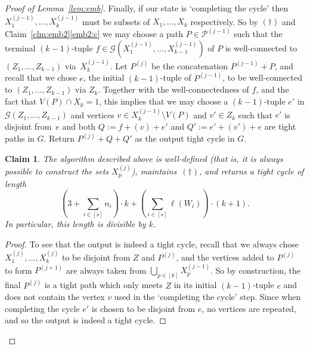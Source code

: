 \documentclass[12pt,a4paper]{amsart}
\newtheorem{claim}[theorem] {Claim}
\newcommand{\oldqed}{}
\def\endofClaim{\hfill\scalebox{.6}{$\Box$}}
\newenvironment{claimproof}[1][Proof]{
  \renewcommand{\oldqed}{\qedsymbol}
  \renewcommand{\qedsymbol}{\endofClaim}
  \begin{proof}[#1]
}{
  \end{proof}
  \renewcommand{\qedsymbol}{\oldqed}
}
\newcommand{\cG}{\mathcal{G}}
\newcommand{\paths}{\mathscr{P}}
\begin{document}
\begin{proof}[Proof of Lemma~\ref{lem:emb}]
Finally, if our state is `completing the cycle' then $X^{(j-1)}_1, \dots, X^{(j-1)}_{k}$ must be subsets of $X_1, \dots, X_{k}$ respectively. So by $(\dagger)$ and Claim~\ref{clm:emb2}\ref{emb2:c} we may choose a path $P \in \paths^{(j-1)}$ such that the terminal $(k-1)$-tuple $f \in \cG(X^{(j-1)}_1, \dots, X^{(j-1)}_{k-1})$ of $P$ is well-connected to $(Z_1, \dots, Z_{k-1})$ via~$X^{(j-1)}_k$. Let $P^{(j)}$ be the concatenation $P^{(j-1)} + P$, and recall that we chose $e$, the initial $(k-1)$-tuple of $P^{(j-1)}$, to be well-connected to $(Z_1, \dots, Z_{k-1})$ via $Z_k$. Together with the well-connectedness of $f$, and the fact that $V(P) \cap X_k = 1$, this implies that we may choose a $(k-1)$-tuple $e'$ in $\cG(Z_1, \ldots, Z_{k-1})$ and vertices $v \in X_k^{(j-1)} \setminus V(P)$ and $v' \in Z_k$  such that $e'$ is disjoint from~$e$ and both $Q := f + (v) + e'$ and $Q' := e' + (v') + e$ are tight paths in $G$. Return $P^{(j)} + Q + Q'$ as the output tight cycle in $G$.

 \begin{claim}\label{clm:emb3}
The algorithm described above is well-defined (that is, it is always possible to
 construct the sets $X^{(j)}_p$), maintains~$(\dagger)$, and returns a tight cycle of length 
$$\left(3 + \sum_{i \in [s]} n_i\right) \cdot k + \left(\sum_{i \in [s]} \ell(W_i)\right) \cdot (k+1).$$ In particular, this length is divisible by $k$.
\end{claim}

\begin{claimproof}
To see that the output is indeed a tight cycle, recall that we always chose $X_1^{(j)}, \dots, X_k^{(j)}$ to be disjoint from $Z$ and $P^{(j)}$, and the vertices added to $P^{(j)}$ to form $P^{(j+1)}$ are always taken from $\bigcup_{p \in [k]} X_p^{(j-1)}$. So by construction, the final $P^{(j)}$ is a tight path which only meets $Z$ in its initial $(k-1)$-tuple $e$ and does not contain the vertex $v$ used in the `completing the cycle' step. Since when completing the cycle $e'$ is chosen to be disjoint from $e$, no vertices are repeated, and so the output is indeed a tight cycle.


\end{claimproof}
\end{proof}
\end{document}
